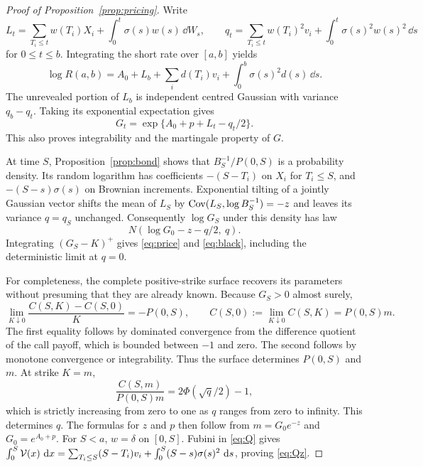 \begin{proof}[Proof of Proposition~\ref{prop:pricing}]
Write
\[
L_t=\sum_{T_i\leq t}w(T_i)X_i+\int_0^t\sigma(s)w(s)\,\dd W_s,\qquad
q_t=\sum_{T_i\leq t}w(T_i)^2v_i+\int_0^t\sigma(s)^2w(s)^2\,\dd s
\]
for $0\leq t\leq b$. Integrating the short rate over $[a,b]$ yields
\[
\log R(a,b)=A_0+L_b+\sum_i d(T_i)v_i+\int_0^b\sigma(s)^2d(s)\,\dd s.
\]
The unrevealed portion of $L_b$ is independent centred Gaussian with variance $q_b-q_t$. Taking its exponential expectation gives
\begin{equation}\label{eq:Gmart}
G_t=\exp\{A_0+p+L_t-q_t/2\}.
\end{equation}
This also proves integrability and the martingale property of $G$.

At time $S$, Proposition~\ref{prop:bond} shows that $B_S^{-1}/P(0,S)$ is a probability density. Its random logarithm has coefficients $-(S-T_i)$ on $X_i$ for $T_i\leq S$, and $-(S-s)\sigma(s)$ on Brownian increments. Exponential tilting of a jointly Gaussian vector shifts the mean of $L_S$ by $\operatorname{Cov}(L_S,\log B_S^{-1})=-z$ and leaves its variance $q=q_S$ unchanged. Consequently $\log G_S$ under this density has law
\[
N(\log G_0-z-q/2,\ q).
\]
Integrating $(G_S-K)^+$ gives \eqref{eq:price} and \eqref{eq:black}, including the deterministic limit at $q=0$.

For completeness, the complete positive-strike surface recovers its parameters without presuming that they are already known. Because $G_S>0$ almost surely,
\[
\lim_{K\downarrow0}\frac{C(S,K)-C(S,0)}{K}=-P(0,S),\qquad
C(S,0):=\lim_{K\downarrow0}C(S,K)=P(0,S)m.
\]
The first equality follows by dominated convergence from the difference quotient of the call payoff, which is bounded between $-1$ and zero. The second follows by monotone convergence or integrability. Thus the surface determines $P(0,S)$ and $m$. At strike $K=m$,
\[
\frac{C(S,m)}{P(0,S)m}=2\Phi(\sqrt q/2)-1,
\]
which is strictly increasing from zero to one as $q$ ranges from zero to infinity. This determines $q$. The formulas for $z$ and $p$ then follow from $m=G_0e^{-z}$ and $G_0=e^{A_0+p}$. For $S<a$, $w=\delta$ on $[0,S]$. Fubini in \eqref{eq:Q} gives $\int_0^S\mathcal V(x)\,\,\mathrm d x=\sum_{T_i\leq S}(S-T_i)v_i+\int_0^S(S-s)\sigma(s)^2\,\,\mathrm d s$, proving \eqref{eq:Qz}.
\end{proof}

